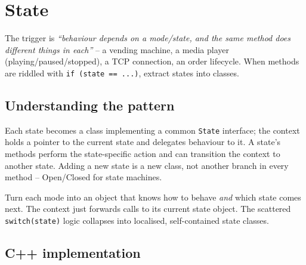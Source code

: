 \section{State}
\label{sec:pat-state}


\begin{patternbox}
The trigger is \emph{``behaviour depends on a mode/state, and the same
method does different things in each''} -- a vending machine, a media
player (playing/paused/stopped), a TCP connection, an order lifecycle.
When methods are riddled with \texttt{if (state == ...)}, extract states
into classes.
\end{patternbox}

\subsection*{Understanding the pattern}

Each state becomes a class implementing a common \texttt{State} interface;
the context holds a pointer to the current state and delegates behaviour to
it. A state's methods perform the state-specific action and can transition
the context to another state. Adding a new state is a new class, not
another branch in every method -- Open/Closed for state machines.

\begin{ideabox}
Turn each mode into an object that knows how to behave \emph{and} which
state comes next. The context just forwards calls to its current state
object. The scattered \texttt{switch(state)} logic collapses into
localised, self-contained state classes.
\end{ideabox}

\subsection*{C++ implementation}

